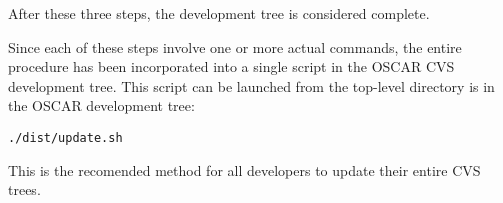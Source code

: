After these three steps, the development tree is considered complete.

Since each of these steps involve one or more actual commands, the
entire procedure has been incorporated into a single script in the
OSCAR CVS development tree.  This script can be launched from the
top-level directory is in the OSCAR development tree:

\vspace{10pt}
\centerline{\tt ./dist/update.sh}
\vspace{10pt}

This is the recomended method for all developers to update their
entire CVS trees.

